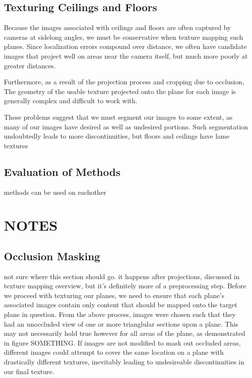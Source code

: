 \documentclass[10pt,twocolumn,letterpaper]{article}
\begin{document}
\subsection{Texturing Ceilings and Floors}


Because the images associated with ceilings and floors are often captured by cameras at sidelong angles, we must be conservative when texture mapping such planes. Since localization errors compound over distance, we often have candidate images that project well on areas near the camera itself, but much more poorly at greater distances. 

Furthermore, as a result of the projection process and cropping due to occlusion, The geometry of the usable texture projected onto the plane for each image is generally complex and difficult to work with.

These problems suggest that we must segment our images to some extent, as many of our images have desired as well as undesired portions. Such segmentation undoubtedly leads to more discontinuities, but floors and ceilings have lame textures


\subsection{Evaluation of Methods}
methods can be used on eachother







\section{NOTES}

\subsection{Occlusion Masking}
not sure where this section should go. it happens after projections,
discussed in texture mapping overview, but it's definitely more of a
preprocessing step.  Before we proceed with texturing our planes, we
need to ensure that each plane's associated images contain only
content that should be mapped onto the target plane in question. From
the above process, images were chosen such that they had an unoccluded
view of one or more trianglular sections upon a plane. This may not
necessarily hold true however for all areas of the plane, as
demonstrated in figure SOMETHING. If images are not modified to mask
out occluded areas, different images could attempt to cover the same
location on a plane with drastically different textures, inevitably
leading to undesireable discontinuities in our final texture.
\end{document}
